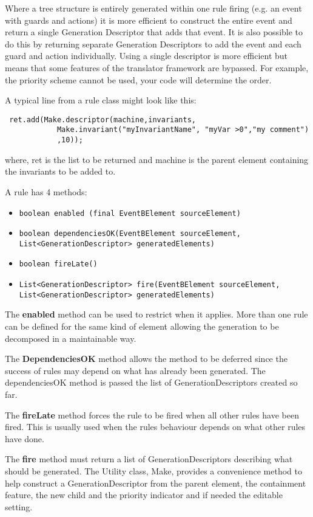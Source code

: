 Where a tree structure is entirely generated within one rule firing (e.g. an event with guards and actions) it is more efficient to construct the entire event and return a single Generation Descriptor that adds that event. It is also possible to do this by returning separate Generation Descriptors to add the event and each guard and action individually. Using a single descriptor is more efficient but means that some features of the translator framework are bypassed. For example, the priority scheme cannot be used, your code will determine the order. 

A typical line from a rule class might look like this:
 \begin{verbatim}
 ret.add(Make.descriptor(machine,invariants,
			Make.invariant("myInvariantName", "myVar >0","my comment")
			,10));
 \end{verbatim}		
where,  ret is the list to be returned and machine is the parent element containing the invariants to be added to.

A rule has 4 methods:
\begin{itemize}
\item \texttt{boolean enabled (final EventBElement sourceElement)}
\item \texttt{boolean dependenciesOK(EventBElement sourceElement, \\  List<GenerationDescriptor> generatedElements)}
\item \texttt{boolean fireLate()}
\item \texttt{List<GenerationDescriptor> fire(EventBElement sourceElement, \\   List<GenerationDescriptor> generatedElements)}
\end{itemize}

The \textbf{enabled} method can be used to restrict when it applies. More than one rule can be defined for the same kind of element allowing the generation to be decomposed in a maintainable way. 

The \textbf{DependenciesOK} method allows the method to be deferred since the success of rules may depend on what has already been generated. The dependenciesOK method is passed the list of GenerationDescriptors created so far.

The \textbf{fireLate} method forces the rule to be fired when all other rules have been fired. This is usually used when the rules behaviour depends on what other rules have done.

The \textbf{fire} method must return a list of GenerationDescriptors describing what should be generated. The Utility class, Make, provides a convenience method to help construct a GenerationDescriptor from the parent element, the containment feature, the new child and the priority indicator and if needed the editable setting.

